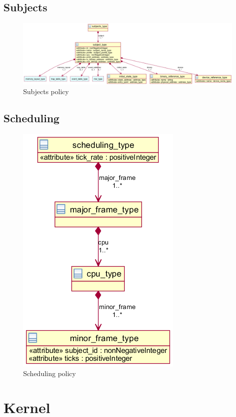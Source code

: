 \subsection{Subjects}
\begin{figure}
	\includegraphics[width=\textwidth]{images/xml_subject.png}
	\caption{Subjects policy}
\end{figure}


\subsection{Scheduling}
\begin{figure}[h]
	\centering
	\includegraphics[scale=0.6]{images/xml_scheduling.png}
	\caption{Scheduling policy}
\end{figure}


\section{Kernel}
